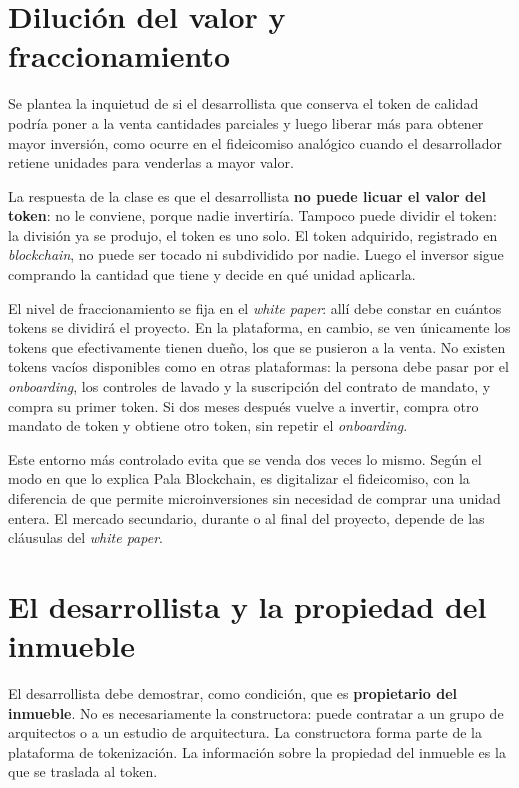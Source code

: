 \documentclass[12pt,oneside]{book}
\begin{document}
\section{Dilución del valor y fraccionamiento}

Se plantea la inquietud de si el desarrollista que conserva el token de calidad podría poner a la venta cantidades parciales y luego liberar más para obtener mayor inversión, como ocurre en el fideicomiso analógico cuando el desarrollador retiene unidades para venderlas a mayor valor.

La respuesta de la clase es que el desarrollista \textbf{no puede licuar el valor del token}: no le conviene, porque nadie invertiría. Tampoco puede dividir el token: la división ya se produjo, el token es uno solo. El token adquirido, registrado en \textit{blockchain}, no puede ser tocado ni subdividido por nadie. Luego el inversor sigue comprando la cantidad que tiene y decide en qué unidad aplicarla.

El nivel de fraccionamiento se fija en el \textit{white paper}: allí debe constar en cuántos tokens se dividirá el proyecto. En la plataforma, en cambio, se ven únicamente los tokens que efectivamente tienen dueño, los que se pusieron a la venta. No existen tokens vacíos disponibles como en otras plataformas: la persona debe pasar por el \textit{onboarding}, los controles de lavado y la suscripción del contrato de mandato, y compra su primer token. Si dos meses después vuelve a invertir, compra otro mandato de token y obtiene otro token, sin repetir el \textit{onboarding}.

Este entorno más controlado evita que se venda dos veces lo mismo. Según el modo en que lo explica Pala Blockchain, es digitalizar el fideicomiso, con la diferencia de que permite microinversiones sin necesidad de comprar una unidad entera. El mercado secundario, durante o al final del proyecto, depende de las cláusulas del \textit{white paper}.

\section{El desarrollista y la propiedad del inmueble}

El desarrollista debe demostrar, como condición, que es \textbf{propietario del inmueble}. No es necesariamente la constructora: puede contratar a un grupo de arquitectos o a un estudio de arquitectura. La constructora forma parte de la plataforma de tokenización. La información sobre la propiedad del inmueble es la que se traslada al token.
\end{document}
